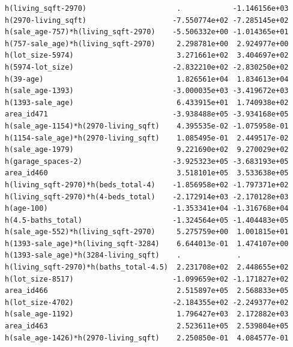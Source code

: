 \documentclass[
]{article}
\begin{document}
\begin{verbatim}
h(living_sqft-2970)                     .            -1.146156e+03
h(2970-living_sqft)                    -7.550774e+02 -7.285145e+02
h(sale_age-757)*h(living_sqft-2970)    -5.506332e+00 -1.014365e+01
h(757-sale_age)*h(living_sqft-2970)     2.298781e+00  2.924977e+00
h(lot_size-5974)                        3.271661e+02  3.404697e+02
h(5974-lot_size)                       -2.832210e+02 -2.830250e+02
h(39-age)                               1.826561e+04  1.834613e+04
h(sale_age-1393)                       -3.000035e+03 -3.419672e+03
h(1393-sale_age)                        6.433915e+01  1.740938e+02
area_id471                             -3.938488e+05 -3.934168e+05
h(sale_age-1154)*h(2970-living_sqft)    4.395535e-02 -1.075958e-01
h(1154-sale_age)*h(2970-living_sqft)    1.085495e-01  2.449517e-02
h(sale_age-1979)                        9.221690e+02  9.270029e+02
h(garage_spaces-2)                     -3.925323e+05 -3.683193e+05
area_id460                              3.518101e+05  3.533638e+05
h(living_sqft-2970)*h(beds_total-4)    -1.856958e+02 -1.797371e+02
h(living_sqft-2970)*h(4-beds_total)    -2.172914e+03 -2.170128e+03
h(age-100)                             -1.353341e+04 -1.316768e+04
h(4.5-baths_total)                     -1.324564e+05 -1.404483e+05
h(sale_age-552)*h(living_sqft-2970)     5.275759e+00  1.001815e+01
h(1393-sale_age)*h(living_sqft-3284)    6.644013e-01  1.474107e+00
h(1393-sale_age)*h(3284-living_sqft)    .             .           
h(living_sqft-2970)*h(baths_total-4.5)  2.231708e+02  2.448655e+02
h(lot_size-8517)                       -1.099659e+02 -1.171827e+02
area_id466                              2.515897e+05  2.568833e+05
h(lot_size-4702)                       -2.184355e+02 -2.249377e+02
h(sale_age-1192)                        1.796427e+03  2.172882e+03
area_id463                              2.523611e+05  2.539804e+05
h(sale_age-1426)*h(2970-living_sqft)    2.250850e-01  4.084577e-01
                                                                  

\end{verbatim}
\end{document}
